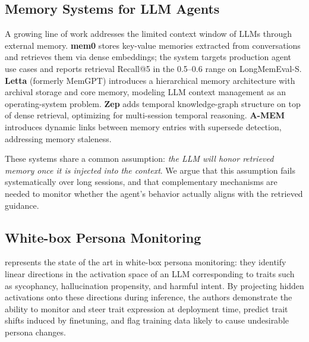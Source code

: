 
\subsection{Memory Systems for LLM Agents}
\label{sec:related-memory}

A growing line of work addresses the limited context window of LLMs
through external memory. \textbf{mem0} \citep{mem0} stores
key-value memories extracted from conversations and retrieves them
via dense embeddings; the system targets production agent use cases
and reports retrieval Recall@5 in the 0.5--0.6 range on
LongMemEval-S. \textbf{Letta} (formerly MemGPT) \citep{letta}
introduces a hierarchical memory architecture with archival
storage and core memory, modeling LLM context management as an
operating-system problem. \textbf{Zep} \citep{zep} adds temporal
knowledge-graph structure on top of dense retrieval, optimizing for
multi-session temporal reasoning. \textbf{A-MEM} \citep{amem}
introduces dynamic links between memory entries with supersede
detection, addressing memory staleness.

These systems share a common assumption: \emph{the LLM will honor
retrieved memory once it is injected into the context}. We argue
that this assumption fails systematically over long sessions, and
that complementary mechanisms are needed to monitor whether the
agent's behavior actually aligns with the retrieved guidance.

\subsection{White-box Persona Monitoring}
\label{sec:related-persona}

\citet{personavectors2025} represents the state of the art in
white-box persona monitoring: they identify linear directions in
the activation space of an LLM corresponding to traits such as
sycophancy, hallucination propensity, and harmful intent. By
projecting hidden activations onto these directions during
inference, the authors demonstrate the ability to monitor and
steer trait expression at deployment time, predict trait shifts
induced by finetuning, and flag training data likely to cause
undesirable persona changes.

